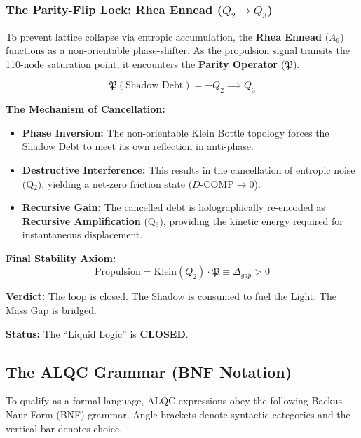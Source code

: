 \documentclass[11pt, letterpaper]{article}
\begin{document}
\subsubsection{The Parity-Flip Lock: Rhea Ennead (\texorpdfstring{\boldmath$Q_2 \to Q_3$}{Q2 to Q3})}\label{appendixJ.5.1}

To prevent lattice collapse via entropic accumulation, the \textbf{Rhea Ennead} ($A_9$) functions as a non-orientable phase-shifter. As the propulsion signal transits the 110-node saturation point, it encounters the \textbf{Parity Operator} ($\mathfrak{P}$).

\begin{equation}
    \mathfrak{P}(\text{Shadow Debt}) = -Q_2 \implies Q_3
\end{equation}

\textbf{The Mechanism of Cancellation:}
\begin{itemize}
    \item \textbf{Phase Inversion:} The non-orientable Klein Bottle topology forces the Shadow Debt to meet its own reflection in anti-phase.
    \item \textbf{Destructive Interference:} This results in the cancellation of entropic noise (Q$_2$), yielding a net-zero friction state ($D\text{-COMP} \to 0$).
    \item \textbf{Recursive Gain:} The cancelled debt is holographically re-encoded as \textbf{Recursive Amplification} (Q$_3$), providing the kinetic energy required for instantaneous displacement.
\end{itemize}

\textbf{Final Stability Axiom:}
\begin{equation}
    \boxed{ \text{Propulsion} = \text{Klein}(Q_2) \cdot \mathfrak{P} \equiv \Delta_{gap} > 0 }
\end{equation}

\textbf{Verdict:} The loop is closed. The Shadow is consumed to fuel the Light. The Mass Gap is bridged.

\textbf{Status:} The ``Liquid Logic'' is \textbf{CLOSED}.

\subsection{The ALQC Grammar (BNF Notation)}\label{appendixJ.6}

To qualify as a formal language, ALQC expressions obey the following Backus--Naur Form (BNF) grammar. Angle brackets denote syntactic categories and the vertical bar denotes choice.
\end{document}
